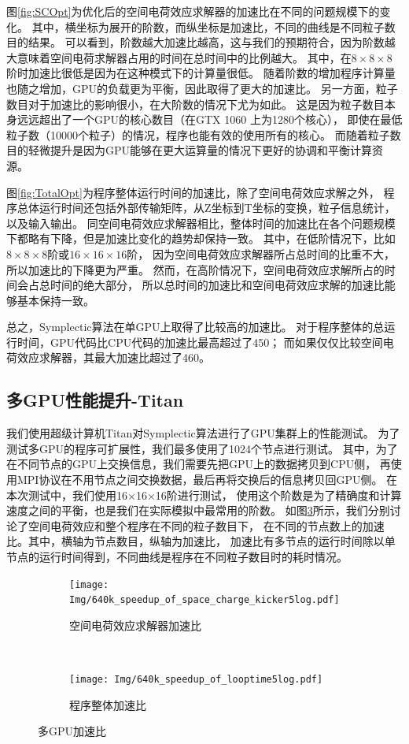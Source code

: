 图\ref{fig:SCOpt}为优化后的空间电荷效应求解器的加速比在不同的问题规模下的变化。
其中，横坐标为展开的阶数，而纵坐标是加速比，不同的曲线是不同粒子数目的结果。
可以看到，阶数越大加速比越高，这与我们的预期符合，因为阶数越大意味着空间电荷求解器占用的时间在总时间中的比例越大。
其中，在$8\times8\times8$阶时加速比很低是因为在这种模式下的计算量很低。
随着阶数的增加程序计算量也随之增加，GPU的负载更为平衡，因此取得了更大的加速比。
另一方面，粒子数目对于加速比的影响很小，在大阶数的情况下尤为如此。
这是因为粒子数目本身远远超出了一个GPU的核心数目（在GTX 1060 上为1280个核心），
即使在最低粒子数（10000个粒子）的情况，程序也能有效的使用所有的核心。
而随着粒子数目的轻微提升是因为GPU能够在更大运算量的情况下更好的协调和平衡计算资源。

图\ref{fig:TotalOpt}为程序整体运行时间的加速比，除了空间电荷效应求解之外，
程序总体运行时间还包括外部传输矩阵，从Z坐标到T坐标的变换，粒子信息统计，以及输入输出。
同空间电荷效应求解器相比，整体时间的加速比在各个问题规模下都略有下降，但是加速比变化的趋势却保持一致。
其中，在低阶情况下，比如$8\times8\times8$阶或$16\times16\times16$阶，
因为空间电荷效应求解器所占总时间的比重不大，所以加速比的下降更为严重。
然而，在高阶情况下，空间电荷效应求解所占的时间会占总时间的绝大部分，
所以总时间的加速比和空间电荷效应求解的加速比能够基本保持一致。

总之，Symplectic算法在单GPU上取得了比较高的加速比。
对于程序整体的总运行时间，GPU代码比CPU代码的加速比最高超过了450；
而如果仅仅比较空间电荷效应求解器，其最大加速比超过了460。

\subsection{多GPU性能提升-Titan}
我们使用超级计算机Titan对Symplectic算法进行了GPU集群上的性能测试。
为了测试多GPU的程序可扩展性，我们最多使用了1024个节点进行测试。
其中，为了在不同节点的GPU上交换信息，我们需要先把GPU上的数据拷贝到CPU侧，
再使用MPI协议在不用节点之间交换数据，最后再将交换后的信息拷贝回GPU侧。
在本次测试中，我们使用16$\times$16$\times$16阶进行测试，
使用这个阶数是为了精确度和计算速度之间的平衡，也是我们在实际模拟中最常用的阶数。
如图\ref{fig:Titan}所示，我们分别讨论了空间电荷效应和整个程序在不同的粒子数目下，
在不同的节点数上的加速比。其中，横轴为节点数目，纵轴为加速比，
加速比有多节点的运行时间除以单节点的运行时间得到，不同曲线是程序在不同粒子数目时的耗时情况。

\begin{figure}[!htb]
    \centering
    \begin{subfigure}[b]{0.9\textwidth}
        \texttt{[image: Img/640k\_speedup\_of\_space\_charge\_kicker5log.pdf]}
        \caption{空间电荷效应求解器加速比}
        \label{fig:SCTitan}
    \end{subfigure}
    \quad
    ~ %
    \begin{subfigure}[b]{0.9\textwidth}
        \texttt{[image: Img/640k\_speedup\_of\_looptime5log.pdf]}
        \caption{程序整体加速比}
        \label{fig:TotalTitan}
    \end{subfigure}
    \caption{多GPU加速比}\label{fig:Titan}
\end{figure}

